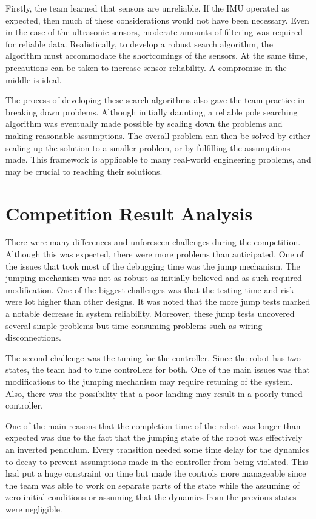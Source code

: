 \documentclass[ece]{uw-wkrpt}
\let\oldsection\section
\renewcommand\section{\clearpage\oldsection}
\begin{document}
Firstly, the team learned that sensors are unreliable. If the IMU operated as expected, then much of these considerations would not have been necessary. Even in the case of the ultrasonic sensors, moderate amounts of filtering was required for reliable data. Realistically, to develop a robust search algorithm, the algorithm must accommodate the shortcomings of the sensors. At the same time, precautions can be taken to increase sensor reliability. A compromise in the middle is ideal.

The process of developing these search algorithms also gave the team practice in breaking down problems. Although initially daunting, a reliable pole searching algorithm was eventually made possible by scaling down the problems and making reasonable assumptions. The overall problem can then be solved by either scaling up the solution to a smaller problem, or by fulfilling the assumptions made. This framework is applicable to many real-world engineering problems, and may be crucial to reaching their solutions. 

\section{Competition Result Analysis}

There were many differences and unforeseen challenges during the competition. Although this was expected, there were more problems than anticipated. One of the issues that took most of the debugging time was the jump mechanism. The jumping mechanism was not as robust as initially believed and as such required modification. One of the biggest challenges was that the testing time and risk were lot higher than other designs. It was noted that the more jump tests marked a notable decrease in system reliability. Moreover, these jump tests uncovered several simple problems but time consuming problems such as wiring disconnections.

The second challenge was the tuning for the controller. Since the robot has two states, the team had to tune controllers for both. One of the main issues was that modifications to the jumping mechanism may require retuning of the system. Also, there was the possibility that a poor landing may result in a poorly tuned controller.

One of the main reasons that the completion time of the robot was longer than expected was due to the fact that the jumping state of the robot was effectively an inverted pendulum. Every transition needed some time delay for the dynamics to decay to prevent assumptions made in the controller from being violated. This had put a huge constraint on time but made the controls more manageable since the team was able to work on separate parts of the state while the assuming of zero initial conditions or assuming that the dynamics from the previous states were negligible.
\end{document}
